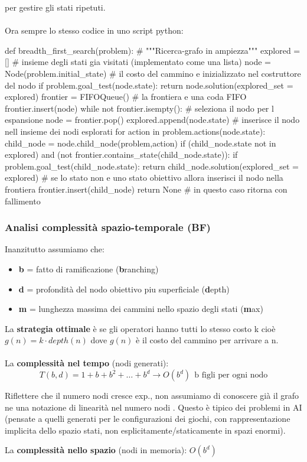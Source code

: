per gestire gli stati ripetuti.\\\\
Ora sempre lo stesso codice in uno script python:
\begin{python}
	def breadth_first_search(problem): # """Ricerca-grafo in ampiezza"""
		explored = [] # insieme degli stati gia visitati (implementato come una lista)
		node = Node(problem.initial_state) # il costo del cammino e inizializzato nel costruttore del nodo
		if problem.goal_test(node.state):
			return node.solution(explored_set = explored)
		frontier = FIFOQueue() # la frontiera e una coda FIFO
		frontier.insert(node)
		while not frontier.isempty(): # seleziona il nodo per l espansione
			node = frontier.pop()
			explored.append(node.state) # inserisce il nodo nell insieme dei nodi esplorati
			for action in problem.actions(node.state):
				child_node = node.child_node(problem,action)
				if (child_node.state not in explored) and (not frontier.contains_state(child_node.state)):
					if problem.goal_test(child_node.state):
						return child_node.solution(explored_set = explored)
					# se lo stato non e uno stato obiettivo allora inserisci il nodo nella frontiera
					frontier.insert(child_node)
		return None # in questo caso ritorna con fallimento
\end{python}

\subsubsection{Analisi complessità spazio-temporale (BF)}
Inanzitutto assumiamo che:
\begin{itemize}
	\item \textbf{b} = fatto di ramificazione (\textbf{b}ranching)
	\item \textbf{d} = profondità del nodo obiettivo piu superficiale (\textbf{d}epth) 
	\item \textbf{m} = lunghezza massima dei cammini nello spazio degli stati (\textbf{m}ax)
\end{itemize}
La \textbf{strategia ottimale} è se gli operatori hanno tutti lo stesso costo k cioè $g(n) = k \cdot depth(n)$ dove $g(n)$ è il costo del 
cammino per arrivare a n.\\\\
La \textbf{complessità nel tempo} (nodi generati):
$$T(b, d) = 1 + b + b^2 + \dots + b^d \to O(b^d) \:\: \text{b figli per ogni nodo}$$
\begin{note}
	Riflettere che il numero nodi cresce exp., non assumiamo di conoscere già il
	grafo ne una notazione di linearità nel numero nodi . Questo è tipico dei problemi in
	AI (pensate a quelli generati per le configurazioni dei giochi, con rappresentazione
	implicita dello spazio stati, non esplicitamente/staticamente in spazi enormi).
\end{note}
\hspace{-15pt}La \textbf{complessità nello spazio} (nodi in memoria): $O(b^d)$

